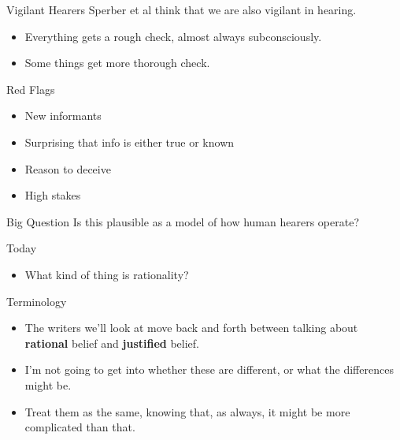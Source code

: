 \documentclass[
  17pt,
  letterpaper,
  ignorenonframetext,
  aspectratio=169,
  handout]{beamer}
\providecommand{\tightlist}{%
  \setlength{\itemsep}{0pt}\setlength{\parskip}{0pt}}\usepackage{longtable,booktabs,array}
\begin{document}
\begin{frame}{Vigilant Hearers}
\protect\hypertarget{vigilant-hearers}{}
Sperber et al think that we are also vigilant in hearing.

\begin{itemize}[<+->]
\tightlist
\item
  Everything gets a rough check, almost always subconsciously.
\item
  Some things get more thorough check.
\end{itemize}
\end{frame}

\begin{frame}{Red Flags}
\protect\hypertarget{red-flags}{}
\begin{itemize}[<+->]
\tightlist
\item
  New informants
\item
  Surprising that info is either true or known
\item
  Reason to deceive
\item
  High stakes
\end{itemize}
\end{frame}

\begin{frame}{Big Question}
\protect\hypertarget{big-question}{}
Is this plausible as a model of how human hearers operate?
\end{frame}

\begin{frame}{Today}
\protect\hypertarget{today}{}
\begin{itemize}[<+->]
\tightlist
\item
  What kind of thing is rationality?
\end{itemize}
\end{frame}

\begin{frame}{Terminology}
\protect\hypertarget{terminology}{}
\begin{itemize}[<+->]
\tightlist
\item
  The writers we'll look at move back and forth between talking about
  \textbf{rational} belief and \textbf{justified} belief.
\item
  I'm not going to get into whether these are different, or what the
  differences might be.
\item
  Treat them as the same, knowing that, as always, it might be more
  complicated than that.
\end{itemize}
\end{frame}
\end{document}
